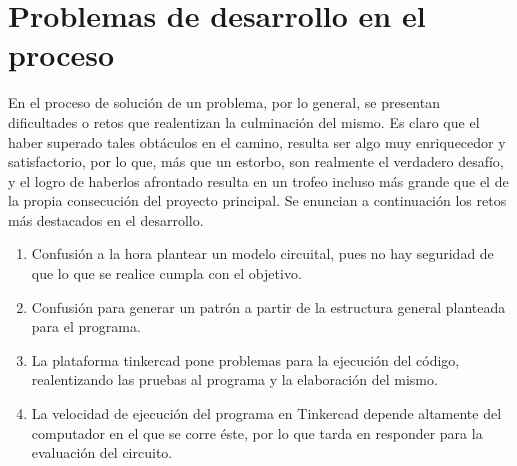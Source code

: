 \documentclass{article}
\begin{document}
\section{Problemas de desarrollo en el proceso}
En el proceso de solución de un problema, por lo general, se presentan dificultades o retos que realentizan la culminación del mismo. Es claro que el haber superado tales obtáculos en el camino, resulta ser algo muy enriquecedor y satisfactorio, por lo que, más que un estorbo, son realmente el verdadero desafío, y el logro de haberlos afrontado resulta en un trofeo incluso más grande que el de la propia consecución del proyecto principal. 
\newline
Se enuncian a continuación los retos más destacados en el desarrollo. 
\begin{enumerate}
    \item 
    Confusión a la hora plantear un modelo circuital, pues no hay seguridad de que lo que se realice cumpla con el objetivo.
    \item 
    Confusión para generar un patrón a partir de la estructura general planteada para el programa. 
    \item
    La plataforma tinkercad pone problemas para la ejecución del código, realentizando las pruebas al programa y la elaboración del mismo. 
    \item
    La velocidad de ejecución del programa en Tinkercad depende altamente del computador en el que se corre éste, por lo que tarda en responder para la evaluación del circuito.
\end{enumerate}
\end{document}
